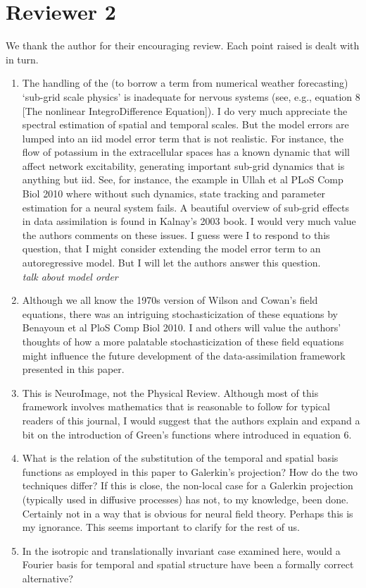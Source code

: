 \documentclass{article}
\begin{document}
    \section{Reviewer 2}
    
    We thank the author for their encouraging review. Each point raised is dealt with in turn.

\begin{enumerate}
    \item The handling of the (to borrow a term from numerical weather forecasting) `sub-grid scale physics' is inadequate for nervous systems (see, e.g., equation 8 [The nonlinear IntegroDifference Equation]). I do very much appreciate the spectral estimation of spatial and temporal scales. But the model errors are lumped into an iid model error term that is not realistic. For instance, the flow of potassium in the extracellular spaces has a known dynamic that will affect network excitability, generating important sub-grid dynamics that is anything but iid. See, for instance, the example in Ullah et al PLoS Comp Biol 2010 where without such dynamics, state tracking and parameter estimation for a neural system fails. A beautiful overview of sub-grid effects in data assimilation is found in Kalnay's 2003 book. I would very much value the authors comments on these issues. I guess were I to respond to this question, that I might consider extending the model error term to an autoregressive model. But I will let the authors answer this question.\\

    \emph{talk about model order}

\item Although we all know the 1970s version of Wilson and Cowan's field equations, there was an intriguing stochasticization of these equations by Benayoun et al PloS Comp Biol 2010. I and others will value the authors' thoughts of how a more palatable stochasticization of these field equations might influence the future development of the data-assimilation framework presented in this paper.
\item This is NeuroImage, not the Physical Review. Although most of this framework involves mathematics that is reasonable to follow for typical readers of this journal, I would suggest that the authors explain and expand a bit on the introduction of Green's functions where introduced in equation 6.
\item What is the relation of the substitution of the temporal and spatial basis functions as employed in this paper to Galerkin's projection? How do the two techniques differ? If this is close, the non-local case for a Galerkin projection (typically used in diffusive processes) has not, to my knowledge, been done. Certainly not in a way that is obvious for neural field theory. Perhaps this is my ignorance. This seems important to clarify for the rest of us.
\item In the isotropic and translationally invariant case examined here, would a Fourier basis for temporal and spatial structure have been a formally correct alternative?\\


\end{enumerate}
\end{document}
